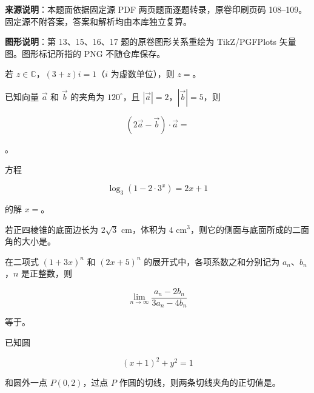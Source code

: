 


\begin{gktip}
\textbf{来源说明}：本题面依据固定源 PDF 两页题面逐题转录，原卷印刷页码 108–109。固定源不附答案，答案和解析均由本库独立复算。

\textbf{图形说明}：第 13、15、16、17 题的原卷图形关系重绘为 TikZ/PGFPlots 矢量图。图形标记所指的 PNG 不随仓库保存。
\end{gktip}


\begin{question}
若 $z\in\mathbb C$，$(3+z)i=1$（$i$ 为虚数单位），则 $z=$\gkblank{}。

\end{question}
\begin{question}
已知向量 $\vec a$ 和 $\vec b$ 的夹角为 $120^\circ$，且 $|\vec a|=2$，$|\vec b|=5$，则

\nopagebreak[4]
\[
(2\vec a-\vec b)\cdot\vec a=
\]

\gkblank{}。

\end{question}
\begin{question}
方程

\nopagebreak[4]
\[
\log_3(1-2\cdot3^x)=2x+1
\]

的解 $x=$\gkblank{}。

\end{question}
\begin{question}
若正四棱锥的底面边长为 $2\sqrt3\text{ cm}$，体积为 $4\text{ cm}^3$，则它的侧面与底面所成的二面角的大小是\gkblank{}。

\end{question}
\begin{question}
在二项式 $(1+3x)^n$ 和 $(2x+5)^n$ 的展开式中，各项系数之和分别记为 $a_n\text{、}b_n$，$n$ 是正整数，则

\nopagebreak[4]
\[
\lim_{n\to\infty}\frac{a_n-2b_n}{3a_n-4b_n}
\]

等于\gkblank{}。

\end{question}
\begin{question}
已知圆

\nopagebreak[4]
\[
(x+1)^2+y^2=1
\]

和圆外一点 $P(0,2)$，过点 $P$ 作圆的切线，则两条切线夹角的正切值是\gkblank{}。

\end{question}
